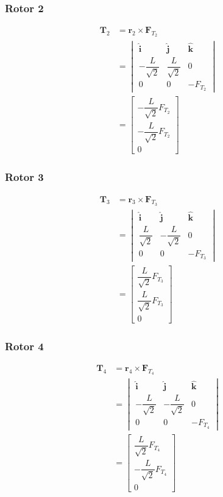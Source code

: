 \documentclass[11pt,a4paper]{article}
\begin{document}
\subsubsection{Rotor 2}

\begin{align}
\mathbf{T}_2
&= \mathbf{r}_2 \times \mathbf{F}_{T_2} \\[2mm]
&=
\begin{vmatrix}
\hat{\mathbf{i}} & \hat{\mathbf{j}} & \hat{\mathbf{k}} \\
-\dfrac{L}{\sqrt{2}} & \dfrac{L}{\sqrt{2}} & 0 \\
0 & 0 & -F_{T_2}
\end{vmatrix} \\[3mm]
&=
\begin{bmatrix}
-\dfrac{L}{\sqrt{2}}F_{T_2} \\
-\dfrac{L}{\sqrt{2}}F_{T_2} \\
0
\end{bmatrix}
\end{align}


\subsubsection{Rotor 3}

\begin{align}
\mathbf{T}_3
&= \mathbf{r}_3 \times \mathbf{F}_{T_3} \\[2mm]
&=
\begin{vmatrix}
\hat{\mathbf{i}} & \hat{\mathbf{j}} & \hat{\mathbf{k}} \\
\dfrac{L}{\sqrt{2}} & -\dfrac{L}{\sqrt{2}} & 0 \\
0 & 0 & -F_{T_3}
\end{vmatrix} \\[3mm]
&=
\begin{bmatrix}
\dfrac{L}{\sqrt{2}}F_{T_3} \\
\dfrac{L}{\sqrt{2}}F_{T_3} \\
0
\end{bmatrix}
\end{align}


\subsubsection{Rotor 4}

\begin{align}
\mathbf{T}_4
&= \mathbf{r}_4 \times \mathbf{F}_{T_4} \\[2mm]
&=
\begin{vmatrix}
\hat{\mathbf{i}} & \hat{\mathbf{j}} & \hat{\mathbf{k}} \\
-\dfrac{L}{\sqrt{2}} & -\dfrac{L}{\sqrt{2}} & 0 \\
0 & 0 & -F_{T_4}
\end{vmatrix} \\[3mm]
&=
\begin{bmatrix}
\dfrac{L}{\sqrt{2}}F_{T_4} \\
-\dfrac{L}{\sqrt{2}}F_{T_4} \\
0
\end{bmatrix}
\end{align}
\end{document}
